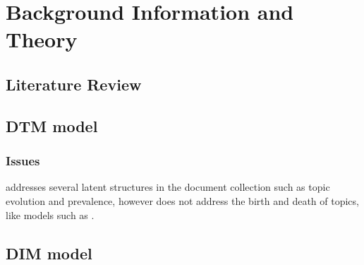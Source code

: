 
\chapter{Background Information and Theory} %

\label{Chapter2} %


\section{Literature Review}

\section{DTM model}
\subsection{Issues}
addresses several latent structures in the document collection such as topic evolution and prevalence, however does not address the birth and death of topics, like models such as \cite{DBLP:journals/corr/abs-1203-3463}.

\section{DIM model}


